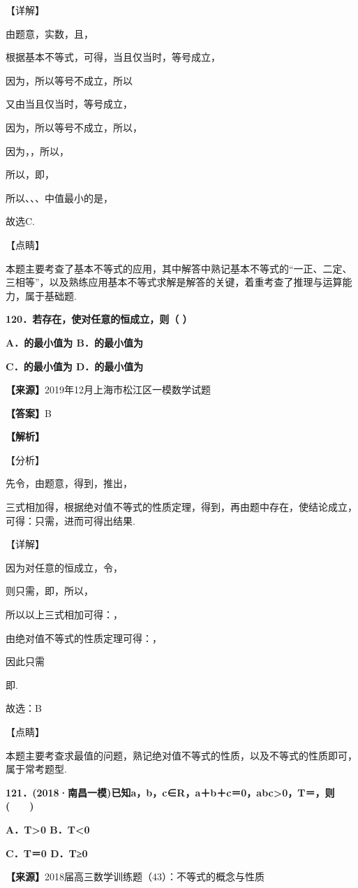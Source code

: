 \documentclass[
]{article}
\begin{document}
【详解】

由题意，实数，且，

根据基本不等式，可得，当且仅当时，等号成立，

因为，所以等号不成立，所以

又由当且仅当时，等号成立，

因为，所以等号不成立，所以，

因为，，所以，

所以，即，

所以、、、中值最小的是，

故选C.

【点睛】

本题主要考查了基本不等式的应用，其中解答中熟记基本不等式的``一正、二定、三相等''，以及熟练应用基本不等式求解是解答的关键，着重考查了推理与运算能力，属于基础题.

\textbf{120．若存在，使对任意的恒成立，则（ ）}

\textbf{A．的最小值为 B．的最小值为}

\textbf{C．的最小值为 D．的最小值为}

\textbf{【来源】}2019年12月上海市松江区一模数学试题

\textbf{【答案】}B

\textbf{【解析】}

【分析】

先令，由题意，得到，推出，

三式相加得，根据绝对值不等式的性质定理，得到，再由题中存在，使结论成立，可得：只需，进而可得出结果.

【详解】

因为对任意的恒成立，令，

则只需，即，所以，

所以以上三式相加可得：，

由绝对值不等式的性质定理可得：，

因此只需

即.

故选：B

【点睛】

本题主要考查求最值的问题，熟记绝对值不等式的性质，以及不等式的性质即可，属于常考题型.

\textbf{121．(2018·南昌一模)已知a，b，c∈R，a＋b＋c＝0，abc\textgreater0，T＝，则(　　)}

\textbf{A．T\textgreater0 B．T\textless0}

\textbf{C．T＝0 D．T≥0}

\textbf{【来源】}2018届高三数学训练题（43）：不等式的概念与性质
\end{document}
